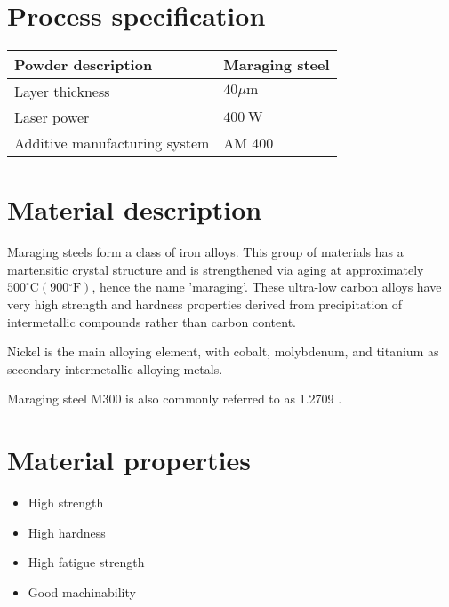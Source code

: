\documentclass[10pt]{article}
\begin{document}
\section*{Process specification}
\begin{center}
\begin{tabular}{|l|l|}
\hline
Powder description & Maraging steel \\
\hline
Layer thickness & $40 \mu \mathrm{m}$ \\
\hline
Laser power & $400 \mathrm{~W}$ \\
\hline
Additive manufacturing system & AM 400 \\
\hline
\end{tabular}
\end{center}

\section*{Material description}
Maraging steels form a class of iron alloys. This group of materials has a martensitic crystal structure and is strengthened via aging at approximately $500^{\circ} \mathrm{C}\left(900{ }^{\circ} \mathrm{F}\right)$, hence the name 'maraging'. These ultra-low carbon alloys have very high strength and hardness properties derived from precipitation of intermetallic compounds rather than carbon content.

Nickel is the main alloying element, with cobalt, molybdenum, and titanium as secondary intermetallic alloying metals.

Maraging steel M300 is also commonly referred to as 1.2709 .

\section*{Material properties}
\begin{itemize}
  \item High strength

  \item High hardness

  \item High fatigue strength

  \item Good machinability

\end{itemize}
\end{document}
